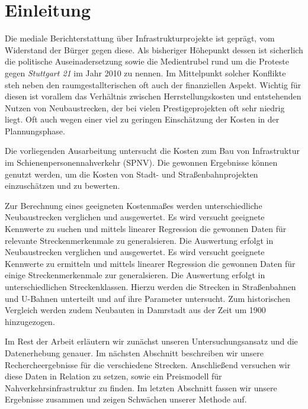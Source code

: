 \chapter{Einleitung}


Die mediale Berichterstattung über Infrastrukturprojekte ist geprägt, vom Widerstand der
Bürger gegen diese. Als bisheriger Höhepunkt dessen ist sicherlich die politische
Auseinadersetzung sowie die Medientrubel rund um die Proteste gegen \emph{Stuttgart 21} im
Jahr 2010 zu nennen. Im Mittelpunkt solcher Konflikte steh neben den raumgestallterischen
oft auch der finanziellen Aspekt. Wichtig für diesen ist vorallem das Verhältnis zwischen
Herrstellungskosten und entstehenden Nutzen von Neubaustrecken, der bei vielen
Prestigeprojekten oft sehr niedrig liegt. Oft auch wegen einer viel zu geringen
Einschätzung der Kosten in der Plannungsphase.

Die vorliegenden Ausarbeitung untersucht die Kosten zum Bau von Infrastruktur im
Schienenpersonennahverkehr (SPNV). Die gewonnen Ergebnisse können genutzt werden, um die
Kosten von Stadt- und Straßenbahnprojekten einzuschätzen und zu bewerten.

Zur Berechnung eines geeigneten Kostenmaßes werden unterschiedliche
Neubaustrecken verglichen und ausgewertet. Es wird versucht geeignete
Kennwerte zu suchen und mittels linearer Regression die gewonnen Daten
für relevante Streckenmerkenmale zu generalsieren. Die Auswertung erfolgt in
Neubaustrecken verglichen und ausgewertet. Es wird versucht geeignete Kennwerte
zu ermitteln und  mittels linearer Regression die gewonnen Daten für einige
Streckenmerkenmale zur generalsieren. Die Auswertung erfolgt in
unterschiedlichen Streckenklassen. Hierzu werden die Strecken in Straßenbahnen
und U-Bahnen unterteilt und auf ihre Parameter untersucht. Zum historischen
Vergleich werden zudem Neubauten in Damrstadt aus der Zeit um 1900 hinzugezogen.

Im Rest der Arbeit erläutern wir zunächst unseren Untersuchungsansatz und die
Datenerhebung genauer. Im nächsten Abschnitt beschreiben wir unsere Rechercheergebnisse
für die verschiedene Strecken. Anschließend versuchen wir diese Daten in Relation zu
setzen, sowie ein Preismodell für Nahverkehrsinfrastruktur zu finden. Im letzten Abschnitt
fassen wir unsere Ergebnisse zusammen und zeigen Schwächen unserer Methode auf.

